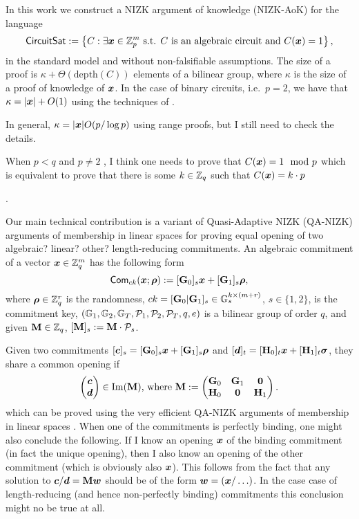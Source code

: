 
\newcommand{\setsize}{t}

In this work we construct a NIZK argument of knowledge (NIZK-AoK) for the language
\[
\mathsf{CircuitSat}:=\left\{
	C : \exists {\boldsymbol{x}}\in\mathbb{Z}_p^m \text{ s.t. } C \text{ is an algebraic circuit and } C({\boldsymbol{x}})=1
	\right\},
\]
in the standard model and without non-falsifiable assumptions.
The size of a proof is $\kappa+\Theta(\mathrm{depth}(C))$ elements of a bilinear group, where $\kappa$ is the size of a proof of knowledge of ${\boldsymbol{x}}$. In the case of binary circuits, i.e.~$p=2$, we have that $\kappa=|{\boldsymbol{x}}|+O(1)$ using the techniques of \cite{AC:GonHevRaf15}. {\color{red} In general, $\kappa=|{\boldsymbol{x}}|O(p/\log p)$ using range proofs, but I still need to check the details.

When $p< q$ and $p\neq 2$ , I think one needs to prove that $C({\boldsymbol{x}}) = 1 \mod p$ which is equivalent to prove that there is some $k\in\mathbb{Z}_q$ such that $C({\boldsymbol{x}}) = k\cdot p$}.

Our main technical contribution is a variant of Quasi-Adaptive NIZK (QA-NIZK) arguments of membership in linear spaces \cite{AC:JutRoy13,C:LPJY13,C:JutRoy14,EC:AbdBenPoi15,EC:KilWee15,AC:GonHevRaf15} for proving equal opening of two {\color{red}algebraic? linear? other?} length-reducing commitments.
An algebraic commitment of a vector ${\boldsymbol{x}}\in\mathbb{Z}_q^m$ has the following form
$$\mathsf{Com}_{ck}({\boldsymbol{x}};{\boldsymbol{\rho}}) := [\mathbf{{G}}_0]_s{\boldsymbol{x}}+[\mathbf{{G}}_1]_s{\boldsymbol{\rho}},$$
where ${\boldsymbol{\rho}}\in\mathbb{Z}_q^r$ is the randomness, $ck=[\mathbf{{G}}_0|\mathbf{{G}}_1]_s\in\mathbb{G}_s^{k\times(m+r)}$, $s\in\{1,2\}$, is the commitment key, $(\mathbb{G}_1,\mathbb{G}_2,\mathbb{G}_T,\mathcal{P}_1,\mathcal{P}_2,\mathcal{P}_T,q,e)$ is a bilinear group of order $q$, and given $\mathbf{{M}}\in\mathbb{Z}_q$, $[\mathbf{{M}}]_s:=\mathbf{{M}}\cdot \mathcal{P}_s$.

Given two commitments $[{\boldsymbol{c}}]_s=[\mathbf{{G}}_0]_s{\boldsymbol{x}}+[\mathbf{{G}}_1]_s{\boldsymbol{\rho}}$ and $[{\boldsymbol{d}}]_t=[\mathbf{{H}}_0]_t{\boldsymbol{x}}+[\mathbf{{H}}_1]_t{\boldsymbol{\sigma}}$, they share a common opening if
$$
\begin{pmatrix}{\boldsymbol{c}}\\{\boldsymbol{d}}\end{pmatrix} \in
\mathrm{Im}(\mathbf{{M}})\text{, where }\mathbf{{M}}:=
\begin{pmatrix}
\mathbf{{G}}_0 & \mathbf{{G}}_1 & \mathbf{{0}}\\
\mathbf{{H}}_0 & \mathbf{{0}}     & \mathbf{{H}}_1
\end{pmatrix}.
$$
which can be proved using the very efficient QA-NIZK arguments of membership in linear spaces \cite{C:JutRoy14,EC:KilWee15,AC:GonHevRaf15}.
When one of the commitments is perfectly binding, one might also conclude the following. If I know an opening ${\boldsymbol{x}}$ of the binding commitment (in fact the unique opening), then I also know an opening of the other commitment (which is obviously also ${\boldsymbol{x}}$). This follows from the fact that any solution to ${\boldsymbol{c}}/{\boldsymbol{d}}=\mathbf{{M}}{\boldsymbol{w}}$ should be of the form ${\boldsymbol{w}}=({\boldsymbol{x}}/\ldots)$. In the case case of length-reducing (and hence non-perfectly binding) commitments this conclusion might no be true at all.

